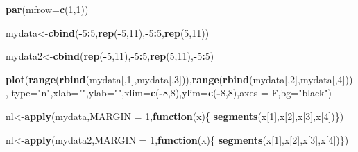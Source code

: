 \documentclass[
]{book}
\newenvironment{Shaded}{\begin{snugshade}}{\end{snugshade}}
\newcommand{\ControlFlowTok}[1]{\textcolor[rgb]{0.13,0.29,0.53}{\textbf{#1}}}
\newcommand{\DataTypeTok}[1]{\textcolor[rgb]{0.13,0.29,0.53}{#1}}
\newcommand{\DecValTok}[1]{\textcolor[rgb]{0.00,0.00,0.81}{#1}}
\newcommand{\KeywordTok}[1]{\textcolor[rgb]{0.13,0.29,0.53}{\textbf{#1}}}
\newcommand{\NormalTok}[1]{#1}
\newcommand{\OperatorTok}[1]{\textcolor[rgb]{0.81,0.36,0.00}{\textbf{#1}}}
\newcommand{\StringTok}[1]{\textcolor[rgb]{0.31,0.60,0.02}{#1}}
\theoremstyle{definition}
\theoremstyle{definition}
\theoremstyle{definition}
\theoremstyle{remark}
\begin{document}
\begin{Shaded}
\begin{Highlighting}[]
\KeywordTok{par}\NormalTok{(}\DataTypeTok{mfrow=}\KeywordTok{c}\NormalTok{(}\DecValTok{1}\NormalTok{,}\DecValTok{1}\NormalTok{))}

\NormalTok{mydata<-}\KeywordTok{cbind}\NormalTok{(}\OperatorTok{-}\DecValTok{5}\OperatorTok{:}\DecValTok{5}\NormalTok{,}\KeywordTok{rep}\NormalTok{(}\OperatorTok{-}\DecValTok{5}\NormalTok{,}\DecValTok{11}\NormalTok{),}\OperatorTok{-}\DecValTok{5}\OperatorTok{:}\DecValTok{5}\NormalTok{,}\KeywordTok{rep}\NormalTok{(}\DecValTok{5}\NormalTok{,}\DecValTok{11}\NormalTok{))}

\NormalTok{mydata2<-}\KeywordTok{cbind}\NormalTok{(}\KeywordTok{rep}\NormalTok{(}\OperatorTok{-}\DecValTok{5}\NormalTok{,}\DecValTok{11}\NormalTok{),}\OperatorTok{-}\DecValTok{5}\OperatorTok{:}\DecValTok{5}\NormalTok{,}\KeywordTok{rep}\NormalTok{(}\DecValTok{5}\NormalTok{,}\DecValTok{11}\NormalTok{),}\OperatorTok{-}\DecValTok{5}\OperatorTok{:}\DecValTok{5}\NormalTok{)}

\KeywordTok{plot}\NormalTok{(}\KeywordTok{range}\NormalTok{(}\KeywordTok{rbind}\NormalTok{(mydata[,}\DecValTok{1}\NormalTok{],mydata[,}\DecValTok{3}\NormalTok{])),}\KeywordTok{range}\NormalTok{(}\KeywordTok{rbind}\NormalTok{(mydata[,}\DecValTok{2}\NormalTok{],mydata[,}\DecValTok{4}\NormalTok{])),}
     \DataTypeTok{type=}\StringTok{"n"}\NormalTok{,}\DataTypeTok{xlab=}\StringTok{""}\NormalTok{,}\DataTypeTok{ylab=}\StringTok{""}\NormalTok{,}\DataTypeTok{xlim=}\KeywordTok{c}\NormalTok{(}\OperatorTok{-}\DecValTok{8}\NormalTok{,}\DecValTok{8}\NormalTok{),}\DataTypeTok{ylim=}\KeywordTok{c}\NormalTok{(}\OperatorTok{-}\DecValTok{8}\NormalTok{,}\DecValTok{8}\NormalTok{),}\DataTypeTok{axes =}\NormalTok{ F,}\DataTypeTok{bg=}\StringTok{"black"}\NormalTok{)}


\NormalTok{nl<-}\KeywordTok{apply}\NormalTok{(mydata,}\DataTypeTok{MARGIN =} \DecValTok{1}\NormalTok{,}\ControlFlowTok{function}\NormalTok{(x)\{}
  \KeywordTok{segments}\NormalTok{(x[}\DecValTok{1}\NormalTok{],x[}\DecValTok{2}\NormalTok{],x[}\DecValTok{3}\NormalTok{],x[}\DecValTok{4}\NormalTok{])\})}

\NormalTok{nl<-}\KeywordTok{apply}\NormalTok{(mydata2,}\DataTypeTok{MARGIN =} \DecValTok{1}\NormalTok{,}\ControlFlowTok{function}\NormalTok{(x)\{}
  \KeywordTok{segments}\NormalTok{(x[}\DecValTok{1}\NormalTok{],x[}\DecValTok{2}\NormalTok{],x[}\DecValTok{3}\NormalTok{],x[}\DecValTok{4}\NormalTok{])\})}



\end{Highlighting}
\end{Shaded}
\end{document}

